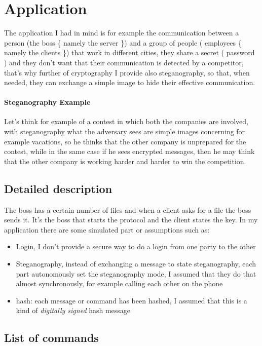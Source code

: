 \chapter{Application}

The application I had in mind is for example the communication between a person (the boss \{ namely the server \}) and a group of people ( employees \{ namely the clients \}) that work in different cities, they share a secret ( password ) and they don't want that their communication is detected by a competitor, that's why further of cryptography I provide also steganography, so that, when needed, they can exchange a simple image to hide their effective communication.
\subsubsection{Steganography Example}
Let's think for example of a contest in which both the companies are involved, with steganography what the adversary sees are simple images concerning for example vacations, so he thinks that the other company is unprepared for the contest, while in the same case if he sees encrypted messages, then he may think that the other company is working harder and harder to win the competition. 

\section{Detailed description}
The boss has a certain number of files and when a client asks for a file the boss sends it.
It's the boss that starts the protocol and the client states the key. 
In my application there are some simulated part or assumptions such as: 
\begin{itemize}
	\item Login, I don't provide a secure way to do a login from one party to the 	other
	\item Steganography, instead of exchanging a message to state steganography, each part autonomously set the steganography
	 mode, I assumed that they do that almost synchronously, for example calling each other on the phone
	 \item hash: each message or command has been hashed, I assumed that this is a kind of \emph{digitally signed} hash message
\end{itemize}

\section{List of commands}
